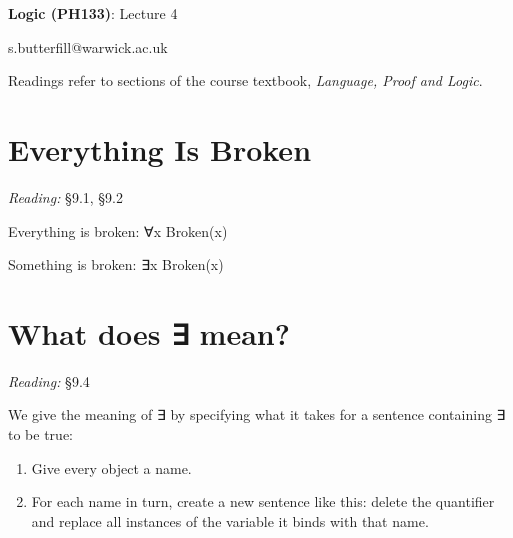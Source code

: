 \documentclass[12pt]{extarticle}
\date{}
\makeatletter
\def \ititle {Origins of Mind}
\def \isubtitle {Lecture 08}
\def \iemail{s.butterfill@warwick.ac.uk}
\makeatother
\begin{document}

\begin{multicols*}{3}

\setlength\footnotesep{1em}







\def \ititle {Logic (PH133)}
 
\def \isubtitle {Lecture 4}
 
\begin{center}
 
{\Large
 
\textbf{\ititle}: \isubtitle
 
}
 
 
 
\iemail %
 
\end{center}
 
Readings refer to sections of the course textbook, \emph{Language, Proof and Logic}.
 
 
 
\section{Everything Is Broken}
 
\emph{Reading:} §9.1, §9.2
 
Everything is broken: ∀x Broken(x)
 
Something is broken: ∃x Broken(x)
 
 
 
\section{What does ∃ mean?}
 
\emph{Reading:} §9.4
 
We give the meaning of ∃ by specifying what it takes for a sentence containing ∃ to be true:
 
\begin{enumerate}
 
\item Give every object a name.
 
\item For each name in turn, create a new sentence like this: delete the quantifier and replace all instances of the variable it binds with that name.
 

\end{enumerate}
\end{multicols*}
\end{document}
